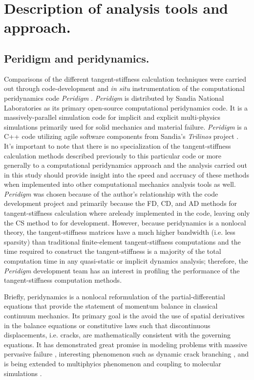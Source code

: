 \documentclass[preprint,12pt]{elsarticle}
\begin{document}
\section{Description of analysis tools and approach.} 
%
\subsection{Peridigm and  peridynamics.}
%
Comparisons of the different tangent-stiffness calculation techniques were carried out through code-development and \emph{in situ} instrumentation of the computational peridynamics code \emph{Peridigm} \cite{peridigm}. \emph{Peridigm} is distributed by Sandia National Laboratories as its primary open-source computational peridynamics code. It is a massively-parallel simulation code for implicit and explicit multi-physics simulations primarily used for solid mechanics and material failure. \emph{Peridigm} is a C++ code utilizing agile software components from Sandia's  \emph{Trilinos} project \cite{trilinos}. It's important to note that there is no specialization of the tangent-stiffness calculation methods described previously to this particular code or more generally to a computational peridynamics approach and the analysis carried out in this study should provide insight into the speed and accruacy of these methods when implemented into other computational mechanics analysis tools as well.  \emph{Peridigm} was chosen because of the author's relationship with the code development project and primarily because the FD, CD, and AD methods for tangent-stiffness calculation where areleady implemented in the code, leaving only the CS method to for development. However, because peridynamics is a nonlocal theory, the tangent-stiffness matrices have a much higher bandwidth (i.e. less sparsity) than traditional finite-element tangent-stiffness computations and the time required to construct the tangent-stiffness is a majority of the total computation time in any quasi-static or implicit dynamics analysis; therefore, the \emph{Peridigm} development team has an interest in profiling the performance of the tangent-stiffness computation methods.

Briefly, peridynamics \cite{silling2000ret, silling:psa, silling2010peridynamic} is a nonlocal reformulation of the partial-differential equations that provide the statement of momentum balance in classical continuum mechanics. Its primary goal is the avoid the use of spatial derivatives in the balance equations or constitutive laws such that discontinuous displacements, i.e. cracks, are mathematically consistent with the governing equations. It has demonstrated great promise in modeling problems with massive pervasive failure \cite{littlewood2010}, interesting phenomenon such as dynamic crack branching \cite{ha2010sod}, and is being extended to multiphyics phenomenon \cite{bobaru2011peridynamic,katiyar2013} and coupling to molecular simulations \cite{seleson2009peridynamics}.
\end{document}
